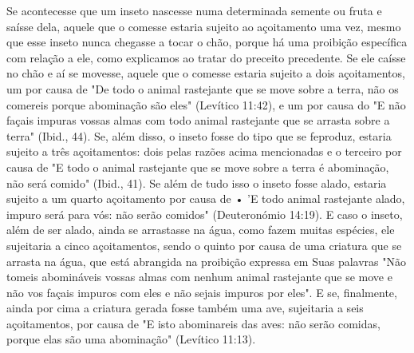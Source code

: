 \begin{itemize}
\begin{enumrate}
\begin{itemize}
\begin{itemize}
\begin{itemize}
Se acontecesse que um inseto nascesse numa determinada semente ou fruta
e saísse dela, aquele que o comesse estaria sujeito ao açoitamento uma
vez, mesmo que esse inseto nunca chegasse a tocar o chão, porque há uma
proi­bição específica com relação a ele, como explicamos ao tratar do
preceito prece­dente. Se ele caísse no chão e aí se movesse, aquele que
o comesse estaria sujeito a dois açoitamentos, um por causa de "De todo
o animal rastejante que se move sobre a terra, não os comereis porque
abominação são eles" (Levítico 11:42), e um por causa do "E não façais
impuras vossas almas com todo animal rastejante que se arrasta sobre a
terra" (Ibid., 44). Se, além disso, o inseto fosse do tipo que se
feproduz, estaria sujeito a três açoitamentos: dois pelas razões acima
mencio­nadas e o terceiro por causa de "E todo o animal rastejante que
se move sobre a terra é abominação, não será comido" (Ibid., 41). Se
além de tudo isso o inseto fosse alado, estaria sujeito a um quarto
açoitamento por causa de • 'E todo animal rastejante alado, impuro será
para vós: não serão comidos" (Deuteronómio 14:19). E caso o inseto, além
de ser alado, ainda se arrastasse na água, como fazem muitas espécies,
ele sujeitaria a cinco açoitamentos, sendo o quinto por causa de uma
criatura que se arrasta na água, que está abrangida na proibição
expressa em Suas palavras "Não tomeis abomináveis vossas almas com
nenhum animal rastejante que se move e não vos façais impuros com eles e
não sejais impuros por eles". E se, finalmente, ainda por cima a
criatura gerada fosse também uma ave, sujeita­ria a seis açoitamentos,
por causa de "E isto abominareis das aves: não serão co­midas, porque
elas são uma abominação" (Levítico 11:13).


\end{itemize}
\end{itemize}
\end{itemize}
\end{enumrate}
\end{itemize}
